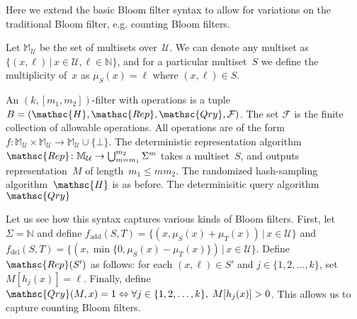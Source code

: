
Here we extend the basic Bloom filter syntax to allow for variations on the traditional Bloom filter, e.g. counting Bloom filters.  

Let $\mathbb{M}_\mathcal{U}$ be the set of multisets over~$\mathcal{U}$.  We can denote any multiset as $\{(x,\ell) \,|\, x \in \mathcal{U}, \ell \in \mathbb{N}\}$, and for a particular multiset~$S$ we define the multiplicity of~$x$ as $\mu_S(x) = \ell$ where $(x,\ell)\in S$.

An $(k,[m_1,m_2])$-filter with operations is a tuple  $B=(\mathsc{H},\mathsc{Rep},\mathsc{Qry}, \mathcal{F})$.  
The set $\mathcal{F}$ is the finite collection of allowable operations.  All operations are of the form 
$f: \mathbb{M}_{\mathcal{U}} \times \mathbb{M}_{\mathcal{U}} \rightarrow \mathbb{M}_{\mathcal{U}} \cup \{\bot\}$.  
%
The deterministic representation algorithm $\mathsc{Rep}\colon \mathbb{M}_\mathcal{U} \rightarrow \bigcup_{m=m_1}^{m_2}\Sigma^m$ takes a multiset~$S$, and outputs representation~$M$ of length~$m_1 \leq m m_2$.   
%
The randomized hash-sampling algorithm~$\mathsc{H}$ is as before.
%
The determinisitic query algorithm $\mathsc{Qry}$ 


Let us see how this syntax captures various kinds of Bloom filters.  First, let $\Sigma = \mathbb{N}$ and define $f_{\mathrm{add}}(S,T)=\{(x,\mu_S(x)+\mu_T(x)) \,|\, x \in \mathcal{U}\}$ and $f_\mathrm{del}(S,T) = \{(x,\min\{0,\mu_S(x)-\mu_T(x)\}) \,|\, x \in \mathcal{U} \}$.  Define $\mathsc{Rep}(S')$ as follows: for each $(x,\ell)\in S'$ and $j\in\{1,2,\ldots,k\}$, set $M[h_j(x)]=\ell$.   Finally, define $\mathsc{Qry}(M,x) = 1 \Leftrightarrow \forall j \in \{1,2,\ldots,k\},\; M[h_j(x)] > 0$.  This allows us to capture counting Bloom filters. 

